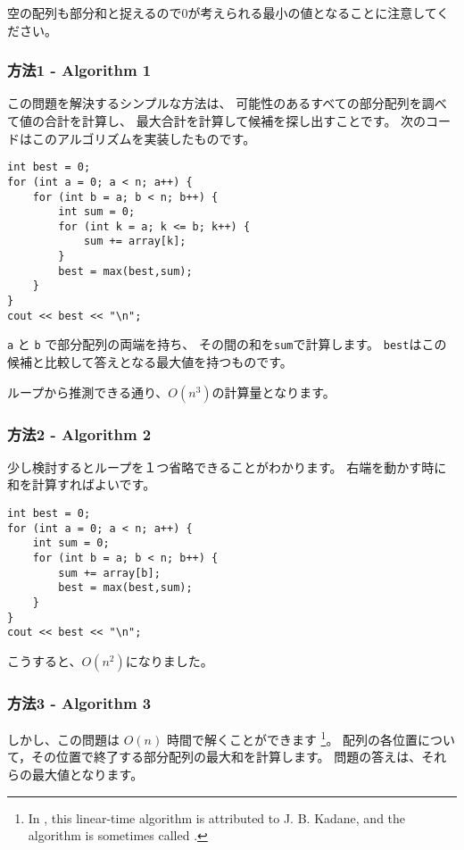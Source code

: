 空の配列も部分和と捉えるので$0$が考えられる最小の値となることに注意してください。

\subsubsection{方法1 - Algorithm 1}

この問題を解決するシンプルな方法は、
可能性のあるすべての部分配列を調べて値の合計を計算し、
最大合計を計算して候補を探し出すことです。
次のコードはこのアルゴリズムを実装したものです。

\begin{lstlisting}
int best = 0;
for (int a = 0; a < n; a++) {
    for (int b = a; b < n; b++) {
        int sum = 0;
        for (int k = a; k <= b; k++) {
            sum += array[k];
        }
        best = max(best,sum);
    }
}
cout << best << "\n";
\end{lstlisting}

\texttt{a} と \texttt{b} で部分配列の両端を持ち、
その間の和を\texttt{sum}で計算します。
\texttt{best}はこの候補と比較して答えとなる最大値を持つものです。

ループから推測できる通り、$O(n^3)$の計算量となります。

\subsubsection{方法2 - Algorithm 2}

少し検討するとループを１つ省略できることがわかります。
右端を動かす時に和を計算すればよいです。
\begin{lstlisting}
int best = 0;
for (int a = 0; a < n; a++) {
    int sum = 0;
    for (int b = a; b < n; b++) {
        sum += array[b];
        best = max(best,sum);
    }
}
cout << best << "\n";
\end{lstlisting}
こうすると、$O(n^2)$になりました。

\subsubsection{方法3 - Algorithm 3}

しかし、この問題は $O(n)$ 時間で解くことができます
\footnote{In \cite{ben86}, this linear-time algorithm
is attributed to J. B. Kadane, and the algorithm is sometimes
called  .}。
配列の各位置について，その位置で終了する部分配列の最大和を計算します。
問題の答えは、それらの最大値となります。

